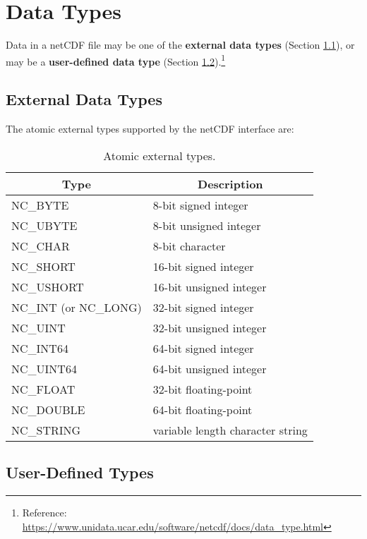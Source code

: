 \section{Data Types}

\tab
Data in a netCDF file may be one of the \textbf{external data types} (Section \ref{ed-type}), or may be a \textbf{user-defined data type} (Section \ref{ud-type}).\footnote{Reference: \url{https://www.unidata.ucar.edu/software/netcdf/docs/data_type.html}}

\subsection{External Data Types}
\label{ed-type}

\tab
The atomic external types supported by the netCDF interface are:

\begin{table}[H]
\centering
\begin{tabular}{|l|l|}
\hline
\multicolumn{1}{|c|}{Type} & \multicolumn{1}{|c|}{Description} \\ \hline \hline
NC\_BYTE & 8-bit signed integer \\ \hline
NC\_UBYTE & 8-bit unsigned integer \\ \hline
NC\_CHAR & 8-bit character \\ \hline
NC\_SHORT & 16-bit signed integer \\ \hline
NC\_USHORT & 16-bit unsigned integer \\ \hline
NC\_INT (or NC\_LONG) & 32-bit signed integer \\ \hline
NC\_UINT & 32-bit unsigned integer \\ \hline
NC\_INT64 & 64-bit signed integer \\ \hline
NC\_UINT64 & 64-bit unsigned integer \\ \hline
NC\_FLOAT & 32-bit floating-point \\ \hline
NC\_DOUBLE & 64-bit floating-point \\ \hline
NC\_STRING & variable length character string \\ \hline
\hline
\end{tabular}
\caption{\label{tab_modes_open} Atomic external types.}
\end{table}

\subsection{User-Defined Types}
\label{ud-type}

